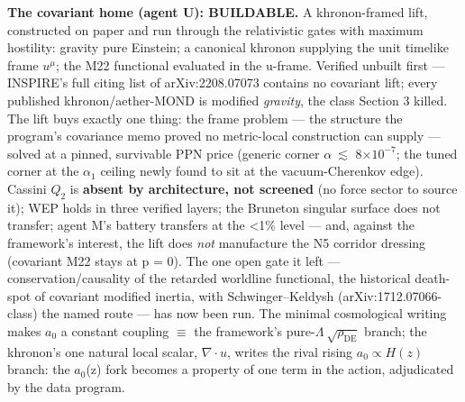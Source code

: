 \documentclass[11pt,a4paper]{article}
\begin{document}
\textbf{The covariant home (agent U): BUILDABLE.} A khronon-framed lift, constructed on paper and run through the relativistic gates with maximum hostility: gravity pure Einstein; a canonical khronon supplying the unit timelike frame $u^\mu$; the M22 functional evaluated in the u-frame. Verified unbuilt first --- INSPIRE's full citing list of arXiv:2208.07073 contains no covariant lift; every published khronon/aether-MOND is modified \emph{gravity}, the class Section 3 killed. The lift buys exactly one thing: the frame problem --- the structure the program's covariance memo proved no metric-local construction can supply --- solved at a pinned, survivable PPN price (generic corner $\alpha\ \lesssim$ 8$\times10^{-7}$; the tuned corner at the $\alpha_{1}$ ceiling newly found to sit at the vacuum-Cherenkov edge). Cassini $Q_2$ is \textbf{absent by architecture, not screened} (no force sector to source it); WEP holds in three verified layers; the Bruneton singular surface does not transfer; agent M's battery transfers at the <1\% level --- and, against the framework's interest, the lift does \emph{not} manufacture the N5 corridor dressing (covariant M22 stays at p = 0). The one open gate it left --- conservation/causality of the retarded worldline functional, the historical death-spot of covariant modified inertia, with Schwinger--Keldysh (arXiv:1712.07066-class) the named route --- has now been run. The minimal cosmological writing makes $a_{0}$ a constant coupling $\equiv$ the framework's pure-$\Lambda\ \sqrt{\rho_{\mathrm{DE}}}$ branch; the khronon's one natural local scalar, $\nabla\cdot u$, writes the rival rising $a_0 \propto H(z)$ branch: the $a_{0}$(z) fork becomes a property of one term in the action, adjudicated by the data program.
\end{document}

